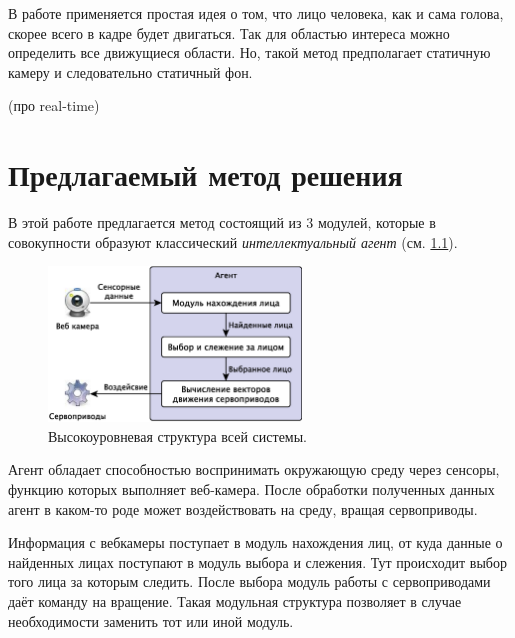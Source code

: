 \documentclass[12pt]{report}
\begin{document}
В работе \citep{zhang2010fast} применяется простая идея о том, что лицо человека, как и сама голова, скорее всего в кадре будет двигаться. Так для областью интереса можно определить все движущиеся области. Но, такой метод предполагает статичную камеру и следовательно статичный фон.

(про real-time)

\chapter{Предлагаемый метод решения}
\thispagestyle{fancy}

В этой работе предлагается метод состоящий из 3 модулей, которые в совокупности образуют классический \emph{интеллектуальный агент} (см. \ref{fig:agent}). 

\begin{figure}[h]
	\centering
	\includegraphics[width=0.6\textwidth]{Pictures/Agent.eps}
	\caption{Высокоуровневая структура всей системы.}
	\label{fig:agent}
\end{figure}

Агент обладает способностью воспринимать окружающую среду через сенсоры, функцию которых выполняет веб-камера. После обработки полученных данных агент в каком-то роде может воздействовать на среду, вращая сервоприводы. \citep{рассел2006искусственный}

Информация с вебкамеры поступает в модуль нахождения лиц, от куда данные о найденных лицах поступают в модуль выбора и слежения. Тут происходит выбор того лица за которым следить. После выбора модуль работы с сервоприводами даёт команду на вращение. Такая модульная структура позволяет в случае необходимости заменить тот или иной модуль. 
\end{document}

